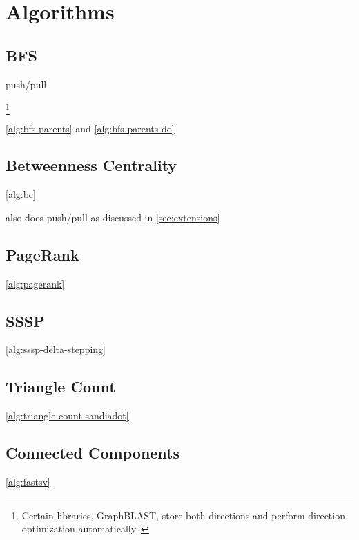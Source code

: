 \section{Algorithms}
\label{sec:algorithms}

\subsection{BFS}
\label{sec:bfs}

push/pull~\cite{DBLP:conf/icpp/YangBO18}

\footnote{Certain \grb libraries, \eg GraphBLAST, store both directions and perform direction-optimization automatically~\cite{DBLP:journals/corr/abs-1908-01407}}



\autoref{alg:bfs-parents} and \autoref{alg:bfs-parents-do}

\subsection{Betweenness Centrality}
\label{sec:bc}



\autoref{alg:bc}

also does push/pull as discussed in \autoref{sec:extensions}

\subsection{PageRank}
\label{sec:pagerank}




\autoref{alg:pagerank}

\subsection{SSSP}
\label{sec:sssp}



\autoref{alg:sssp-delta-stepping}

\subsection{Triangle Count}
\label{sec:triangle-count}



\autoref{alg:triangle-count-sandiadot}

\subsection{Connected Components}
\label{sec:connected-components}



\autoref{alg:fastsv}
